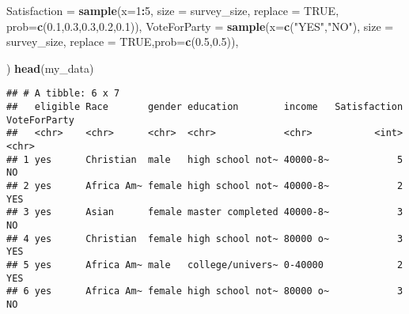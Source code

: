 \documentclass[
]{article}
\newenvironment{Shaded}{\begin{snugshade}}{\end{snugshade}}
\newcommand{\DataTypeTok}[1]{\textcolor[rgb]{0.13,0.29,0.53}{#1}}
\newcommand{\DecValTok}[1]{\textcolor[rgb]{0.00,0.00,0.81}{#1}}
\newcommand{\FloatTok}[1]{\textcolor[rgb]{0.00,0.00,0.81}{#1}}
\newcommand{\KeywordTok}[1]{\textcolor[rgb]{0.13,0.29,0.53}{\textbf{#1}}}
\newcommand{\NormalTok}[1]{#1}
\newcommand{\OperatorTok}[1]{\textcolor[rgb]{0.81,0.36,0.00}{\textbf{#1}}}
\newcommand{\OtherTok}[1]{\textcolor[rgb]{0.56,0.35,0.01}{#1}}
\newcommand{\StringTok}[1]{\textcolor[rgb]{0.31,0.60,0.02}{#1}}
\begin{document}
\begin{Shaded}
\begin{Highlighting}[]
  \DataTypeTok{Satisfaction =} \KeywordTok{sample}\NormalTok{(}\DataTypeTok{x=}\DecValTok{1}\OperatorTok{:}\DecValTok{5}\NormalTok{, }\DataTypeTok{size =}\NormalTok{ survey_size, }\DataTypeTok{replace =} \OtherTok{TRUE}\NormalTok{, }\DataTypeTok{prob=}\KeywordTok{c}\NormalTok{(}\FloatTok{0.1}\NormalTok{,}\FloatTok{0.3}\NormalTok{,}\FloatTok{0.3}\NormalTok{,}\FloatTok{0.2}\NormalTok{,}\FloatTok{0.1}\NormalTok{)),}
  \DataTypeTok{VoteForParty =} \KeywordTok{sample}\NormalTok{(}\DataTypeTok{x=}\KeywordTok{c}\NormalTok{(}\StringTok{"YES"}\NormalTok{,}\StringTok{"NO"}\NormalTok{), }\DataTypeTok{size =}\NormalTok{ survey_size, }\DataTypeTok{replace =} \OtherTok{TRUE}\NormalTok{,}\DataTypeTok{prob=}\KeywordTok{c}\NormalTok{(}\FloatTok{0.5}\NormalTok{,}\FloatTok{0.5}\NormalTok{)),}
  
\NormalTok{)}
\KeywordTok{head}\NormalTok{(my_data)}
\end{Highlighting}
\end{Shaded}

\begin{verbatim}
## # A tibble: 6 x 7
##   eligible Race       gender education        income   Satisfaction VoteForParty
##   <chr>    <chr>      <chr>  <chr>            <chr>           <int> <chr>       
## 1 yes      Christian  male   high school not~ 40000-8~            5 NO          
## 2 yes      Africa Am~ female high school not~ 40000-8~            2 YES         
## 3 yes      Asian      female master completed 40000-8~            3 NO          
## 4 yes      Christian  female high school not~ 80000 o~            3 YES         
## 5 yes      Africa Am~ male   college/univers~ 0-40000             2 YES         
## 6 yes      Africa Am~ female high school not~ 80000 o~            3 NO
\end{verbatim}

\begin{Shaded}
\end{Shaded}
\end{document}
